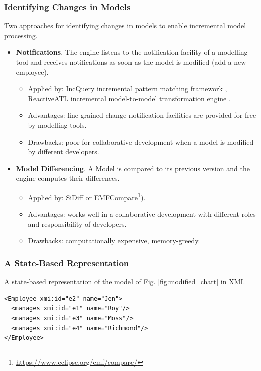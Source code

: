 \documentclass{beamer}
\begin{document}
\begin{frame}
\frametitle{ Identifying Changes in Models}
Two approaches for identifying changes in models to enable incremental model processing.
\begin{itemize}
\item \textbf{Notifications}. The engine listens to the notification facility of a modelling tool and receives notifications as soon as the model is modified (add a new employee). 
\begin{itemize}
\item Applied by: IncQuery incremental pattern matching framework \cite{rath2012derived}, ReactiveATL incremental model-to-model transformation engine \cite{ogunyomi2015property}. 
\item Advantages: fine-grained change notification facilities are provided for free by modelling tools.
\item Drawbacks: poor for collaborative development when a model is modified by different developers.
\end{itemize} 
\item \textbf{Model Differencing}. A Model is compared to its previous version and the engine computes their differences.    
\begin{itemize}
\item Applied by: SiDiff \cite{kelter2005generic} or EMFCompare\footnote{\url{https://www.eclipse.org/emf/compare/}}).
\item Advantages: works well in a collaborative
development with different roles and responsibility of developers.
\item Drawbacks: computationally expensive, memory-greedy.
\end{itemize}
\end{itemize}
\end{frame}

\begin{frame}[fragile]
\frametitle{A State-Based Representation}
A state-based representation of the model of Fig. \ref{fig:modified_chart} in XMI.
\begin{lstlisting}[style=xmi,label=lst:xmimodel]
<Employee xmi:id="e2" name="Jen">
  <manages xmi:id="e1" name="Roy"/>
  <manages xmi:id="e3" name="Moss"/>
  <manages xmi:id="e4" name="Richmond"/>
</Employee>
\end{lstlisting}
\end{frame}
\end{document}
